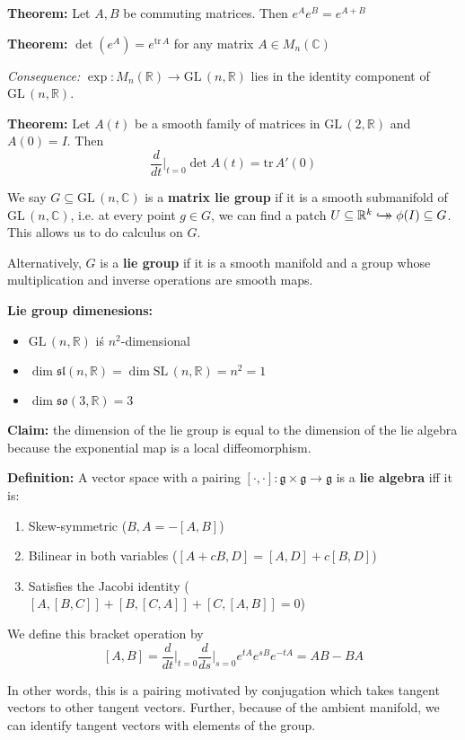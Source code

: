 \documentclass[12pt]{article}
\newcommand{\R}{\mathbb{R}}
\newcommand{\C}{\mathbb{C}}
\newcommand{\SL}{\text{SL}\,}
\newcommand{\GL}{\text{GL}\,}
\newcommand{\tr}{\text{tr}\,}
\newcommand{\biject}{\hookrightarrow \hspace{-8pt} \rightarrow}
\newcommand{\g}{\mathfrak{g}}
\renewcommand{\sl}{\mathfrak{sl}}
\newcommand{\so}{\mathfrak{so}}
\begin{document}
\textbf{Theorem:} Let $A, B$ be commuting matrices. Then $e^A e^B = e^{A+B}$

\textbf{Theorem:} $\det(e^A) = e^{\tr A}$ for any matrix $A \in M_n(\C)$

\emph{Consequence:} $\exp: M_n(\R) \to \GL(n, \R)$ lies in the identity component of $\GL(n, \R)$.

\textbf{Theorem:} Let $A(t)$ be a smooth family of matrices in $\GL(2, \R)$ and $A(0) = I$. Then 
\[\frac{d}{dt}\bigg\vert_{t=0} \det A(t) = \tr A'(0)\]

We say $G \subseteq \GL(n,\C)$ is a \textbf{matrix lie group} if it is a smooth submanifold of $\GL(n, \C)$, i.e. at every point $g \in G$, we can find a patch $U \subseteq \R^k \biject \phi(I) \subseteq G$. This allows us to do calculus on $G$.

Alternatively, $G$ is a \textbf{lie group} if it is a smooth manifold and a group whose multiplication and inverse operations are smooth maps. 

\textbf{Lie group dimenesions:}
\begin{itemize}
    \item $\GL(n, \R)$ iś $n^2$-dimensional 
    \item $\dim \sl(n, \R) = \dim \SL(n, \R) = n^2 = 1$
    \item $\dim \so(3, \R) = 3$
\end{itemize}

\textbf{Claim:} the dimension of the lie group is equal to the dimension of the lie algebra because the exponential map is a local diffeomorphism. 

\textbf{Definition:} A vector space with a pairing $[\cdot, \cdot]: \g \times \g \to \g$ is a \textbf{lie algebra} iff it is: 
\begin{enumerate}
    \item Skew-symmetric (${B, A} = -[A, B]$)
    \item Bilinear in both variables ($[A + cB, D] = [A, D] + c[B, D]$)
    \item Satisfies the Jacobi identity ($[A, [B, C]] + [B, [C, A]] + [C, [A, B]] = 0$)
\end{enumerate}

We define this bracket operation by 
\[[A, B] = \frac{d}{dt}\bigg\vert_{t=0} \frac{d}{ds}\bigg\vert_{s=0} e^{tA}e^{sB}e^{-tA} = AB - BA\]

In other words, this is a pairing motivated by conjugation which takes tangent vectors to other tangent vectors. Further, because of the ambient manifold, we can identify tangent vectors with elements of the group. 
\end{document}
